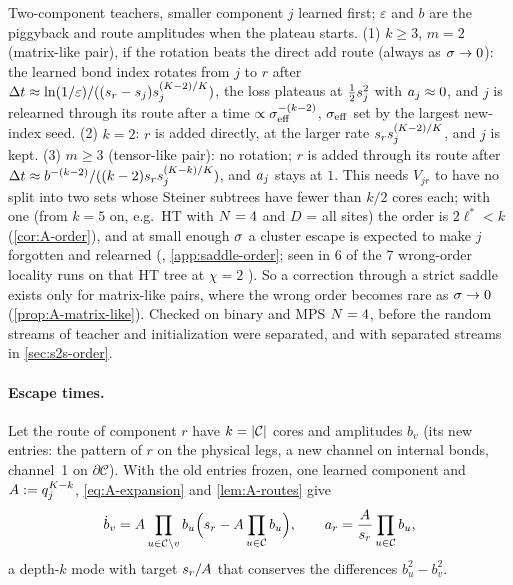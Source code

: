 \begin{remark}\label{rem:A-wrong-order}
  \derived{} \newresult[beyond binary $\Ns=4$; there, a deep linear network, the strict wrong-order saddle is
  known: \citealp{achour2024loss}, Thm~7] Two-component teachers, smaller component $j$ learned first; $\varepsilon$ and $b$ are the
  piggyback and route amplitudes when the plateau starts. (1) $k\ge3$, $m=2$ (matrix-like pair), if the
  rotation beats the direct add route (always as $\sigma\to0$): the learned bond index rotates from $j$ to $r$
  after $\Delta t\approx\ln(1/\varepsilon)/((s_{r}-s_{j})s_{j}^{(K-2)/K})$, the loss plateaus at $\frac12s_{j}^2$ with
  $a_{j}\approx0$, and $j$ is relearned through its route after a time $\propto\sigma_{\rm eff}^{-(k-2)}$, $\sigma_{\rm eff}$ set
  by the largest new-index seed. (2) $k=2$: $r$ is added directly, at the larger rate $s_{r}s_{j}^{(K-2)/K}$,
  and $j$ is kept. (3) $m\ge3$ (tensor-like pair): no rotation; $r$ is added through its route after
  $\Delta t\approx b^{-(k-2)}/((k-2)s_{r}s_{j}^{(K-k)/K})$, and $a_{j}$ stays at $1$. This needs $V_{jr}$
  to have no split into two sets whose Steiner subtrees have fewer than $k/2$ cores each; with one (from $k=5$ on, e.g.\ HT with $\Ns=4$ and
  $D$ = all sites) the order is $2\ell^*<k$ (\cref{cor:A-order}), and at small enough $\sigma$ a cluster escape
  is expected to make $j$ forgotten and relearned (\conjecture, \cref{app:saddle-order}; seen in 6 of the 7
  wrong-order locality runs on that HT tree at $\chi=2$ \empirical). So a correction through a
  strict saddle exists only for matrix-like pairs, where the wrong order becomes rare as $\sigma\to0$
  (\cref{prop:A-matrix-like}). Checked on binary and MPS $\Ns=4$, before the random streams of teacher and
  initialization were separated, and with separated streams in \cref{sec:s2s-order}.
\end{remark}

\paragraph{Escape times.}
Let the route of component $r$ have $k=\lvert\mathcal C\rvert$ cores and amplitudes $b_v$ (its new entries: the pattern
of $r$ on the physical legs, a new channel on internal bonds, channel~1 on $\partial\mathcal C$). With the old
entries frozen, one learned component and $A:=q_j^{K-k}$, \eqref{eq:A-expansion} and \cref{lem:A-routes} give
\begin{equation}\label{eq:A-route-ode}
  \dot b_v=A\prod_{u\in\mathcal C\setminus v}b_u\Big(s_{r}-A\prod_{u\in\mathcal C}b_u\Big),\qquad
  a_{r}=\frac{A}{s_{r}}\prod_{u\in\mathcal C}b_u ,
\end{equation}
a depth-$k$ mode with target $s_{r}/A$ that conserves the differences $b_u^2-b_v^2$.

